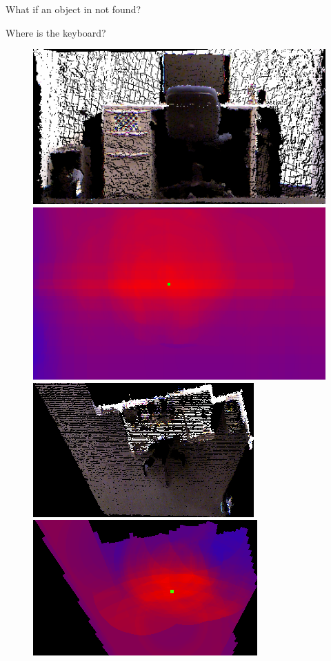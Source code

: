 \documentclass{beamer}
\begin{document}
\begin{frame}{What if an object in not found?}
\begin{center}
Where is the keyboard?
 \begin{figure}   
\includegraphics[width=0.5\linewidth]{frontCropped.png}
\includegraphics[width=0.5\linewidth]{frontHeatCropped.png} \\
\includegraphics[width=0.5\linewidth]{topCropped.png}
\includegraphics[width=0.5\linewidth]{topHeatCropped.png} \\
 \end{figure}
 \end{center}
\end{frame}
\end{document}
